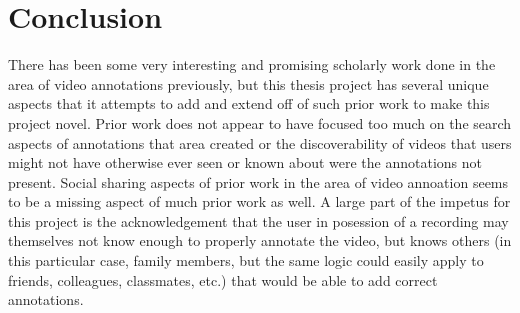 \cite{WEB:BusinessWire:2015,WEB:IMDB:2016,WEB:Amazon:2015,WEB:Engadget:2012,WEB:VentureBeat:2015,WEB:Wired:2015,WEB:Gizmodo:2012}


\section{Conclusion}
\label{sec:priorwork:conclusion}

There has been some very interesting and promising scholarly work done in the area of video annotations previously, but this thesis project has several unique aspects that it attempts to add and extend off of such prior work to make this project novel. Prior work does not appear to have focused too much on the search aspects of annotations that area created or the discoverability of videos that users might not have otherwise ever seen or known about were the annotations not present.  Social sharing aspects of prior work in the area of video annoation seems to be a missing aspect of much prior work as well.  A large part of the impetus for this project is the acknowledgement that the user in posession of a recording may themselves not know enough to properly annotate the video, but knows others (in this particular case, family members, but the same logic could easily apply to friends, colleagues, classmates, etc.) that would be able to add correct annotations.

